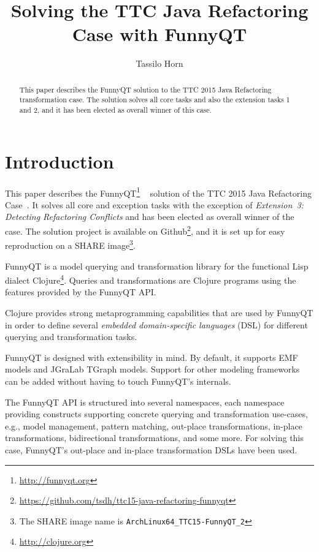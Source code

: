 \documentclass[submission]{eptcs}
\title{Solving the TTC Java Refactoring Case with FunnyQT}
\author{Tassilo Horn
  \institute{Institute for Software Technology, University Koblenz-Landau, Germany}
  \email{horn@uni-koblenz.de}}
\begin{document}
\maketitle

\begin{abstract}
  This paper describes the FunnyQT solution to the TTC 2015 Java Refactoring
  transformation case.  The solution solves all core tasks and also the
  extension tasks 1 and 2, and it has been elected as overall winner of this
  case.
\end{abstract}


\section{Introduction}
\label{sec:introduction}

This paper describes the FunnyQT\footnote{\url{http://funnyqt.org}}
~\cite{Horn2013MQWFQ,funnyqt-icgt15} solution of the TTC 2015 Java Refactoring
Case~\cite{java-refactoring-case-desc}.  It solves all core and exception tasks
with the exception of \emph{Extension~3: Detecting Refactoring Conflicts} and
has been elected as overall winner of the case.  The solution project is
available on
Github\footnote{\url{https://github.com/tsdh/ttc15-java-refactoring-funnyqt}},
and it is set up for easy reproduction on a SHARE image\footnote{The SHARE
  image name is \verb|ArchLinux64_TTC15-FunnyQT_2|}.

FunnyQT is a model querying and transformation library for the functional Lisp
dialect Clojure\footnote{\url{http://clojure.org}}.  Queries and
transformations are Clojure programs using the features provided by the FunnyQT
API.

Clojure provides strong metaprogramming capabilities that are used by FunnyQT
in order to define several \emph{embedded domain-specific languages} (DSL) for
different querying and transformation tasks.

FunnyQT is designed with extensibility in mind.  By default, it supports EMF
models and JGraLab TGraph models.  Support for other modeling frameworks can be
added without having to touch FunnyQT's internals.

The FunnyQT API is structured into several namespaces, each namespace providing
constructs supporting concrete querying and transformation use-cases, e.g.,
model management, pattern matching, out-place transformations, in-place
transformations, bidirectional transformations, and some more.  For solving
this case, FunnyQT's out-place and in-place transformation DSLs have been used.
\end{document}

